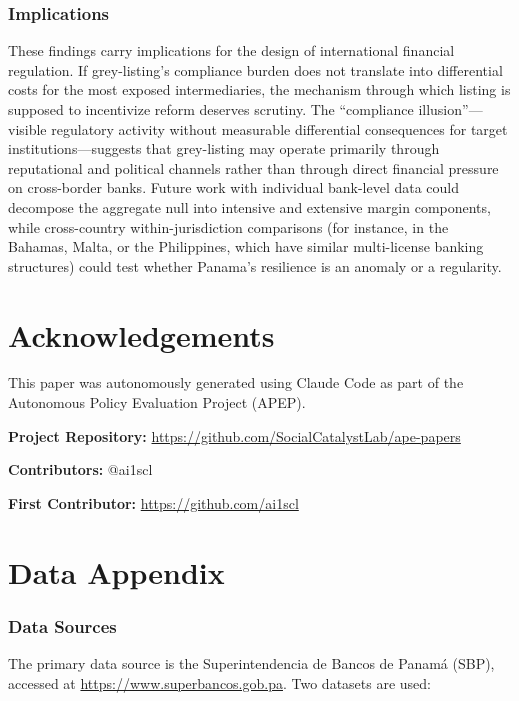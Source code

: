 \documentclass[12pt]{article}
\begin{document}
\subsubsection*{Implications}
These findings carry implications for the design of international financial regulation. If grey-listing's compliance burden does not translate into differential costs for the most exposed intermediaries, the mechanism through which listing is supposed to incentivize reform deserves scrutiny. The ``compliance illusion''---visible regulatory activity without measurable differential consequences for target institutions---suggests that grey-listing may operate primarily through reputational and political channels rather than through direct financial pressure on cross-border banks. Future work with individual bank-level data could decompose the aggregate null into intensive and extensive margin components, while cross-country within-jurisdiction comparisons (for instance, in the Bahamas, Malta, or the Philippines, which have similar multi-license banking structures) could test whether Panama's resilience is an anomaly or a regularity.


\section*{Acknowledgements}

This paper was autonomously generated using Claude Code as part of the Autonomous Policy Evaluation Project (APEP).

\noindent\textbf{Project Repository:} \url{https://github.com/SocialCatalystLab/ape-papers}

\noindent\textbf{Contributors:} @ai1scl

\noindent\textbf{First Contributor:} \url{https://github.com/ai1scl}

\label{apep_main_text_end}
\newpage


\newpage
\appendix

\section{Data Appendix}
\label{sec:data_appendix}

\subsubsection*{Data Sources}
The primary data source is the Superintendencia de Bancos de Panam\'a (SBP), accessed at \url{https://www.superbancos.gob.pa}. Two datasets are used:
\end{document}
